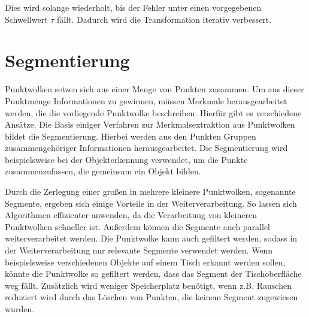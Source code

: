 Dies wird solange wiederholt, bis der Fehler unter einen vorgegebenen Schwellwert $ \tau $ fällt. Dadurch wird die Transformation iterativ verbessert. 



\section[Segmentierung (Schmelzer)]{Segmentierung}

Punktwolken setzen sich aus einer Menge von Punkten zusammen. Um aus dieser Punktmenge Informationen zu gewinnen, müssen Merkmale herausgearbeitet werden, die die vorliegende Punktwolke beschreiben. Hierfür gibt es verschiedene Ansätze.
Die Basis einiger Verfahren zur Merkmalsextraktion aus Punktwolken bildet die Segmentierung. Hierbei werden aus den Punkten Gruppen zusammengehöriger Informationen herausgearbeitet. Die Segmentierung wird beispielsweise bei der Objekterkennung verwendet, um die Punkte zusammenzufassen, die gemeinsam  ein Objekt bilden. 

Durch die Zerlegung einer großen in mehrere kleinere Punktwolken, sogenannte Segmente, ergeben sich einige Vorteile in der Weiterverarbeitung. So lassen sich Algorithmen effizienter anwenden, da die Verarbeitung von kleineren Punktwolken schneller ist. Außerdem können die Segmente auch parallel weiterverarbeitet werden. Die Punkt\-wol\-ke kann auch gefiltert werden, sodass in der Weiterverarbeitung nur relevante Segmente verwendet werden. Wenn beispielsweise verschiedenen Objekte auf einem Tisch erkannt werden sollen, könnte die Punktwolke so gefiltert werden, dass das Segment der Tischoberfläche weg fällt. Zusätzlich wird weniger Speicherplatz benötigt, wenn z.B. Rauschen reduziert wird durch das Löschen von Punkten, die keinem Segment zugewiesen wurden. 

